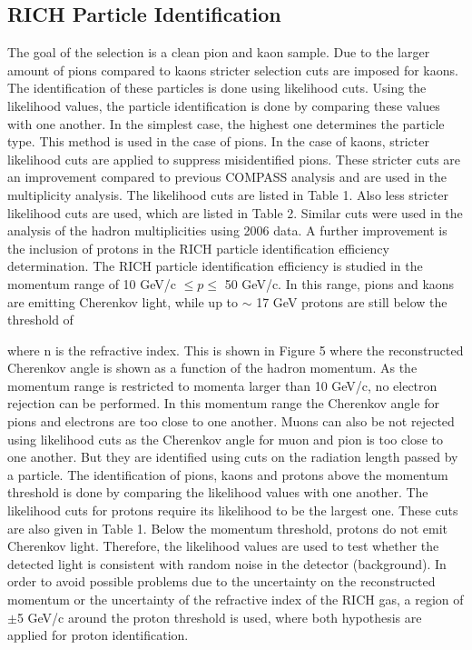 \subsection{RICH Particle Identification}

The goal of the selection is a clean pion and kaon sample. Due to the larger amount of pions compared to kaons stricter selection cuts are imposed for kaons. The
identification of these particles is done using likelihood cuts. Using the likelihood values, the particle identification is done by comparing these values with one
another. In the simplest case, the highest one determines the particle type. This method is used in the case of pions. In the case of kaons, stricter likelihood cuts
are applied to suppress misidentified pions. These stricter cuts are an improvement compared to previous COMPASS analysis and are used in the multiplicity analysis.
The likelihood cuts are listed in Table 1. Also less stricter likelihood cuts are used, which are listed in Table 2. Similar cuts were used in the analysis of the hadron
multiplicities using 2006 data. A further improvement is the inclusion of protons in the RICH particle identification efficiency determination.
The RICH particle identification efficiency is studied in the momentum range of 10 GeV/c $ \leq p \leq $ 50 GeV/c. In this range, pions and kaons are emitting Cherenkov
light, while up to $\sim$ 17 GeV protons are still below the threshold of


where n is the refractive index. This is shown in Figure 5 where the reconstructed Cherenkov angle is shown as a function of the hadron momentum. As the momentum range
is restricted to momenta larger than 10 GeV/c, no electron rejection can be performed. In this momentum range the Cherenkov angle for pions and electrons are too close
to one another. Muons can also be not rejected using likelihood cuts as the Cherenkov angle for muon and pion is too close to one another. But they are identified using
cuts on the radiation length passed by a particle. The identification of pions, kaons and protons above the momentum threshold is done by comparing the likelihood values
with one another. The likelihood cuts for protons require its likelihood to be the largest one. These cuts are also given in Table 1. Below the momentum threshold, protons
do not emit Cherenkov light. Therefore, the likelihood values are used to test whether the detected light is consistent with random noise in the detector (background).
In order to avoid possible problems due to the uncertainty on the reconstructed momentum or the uncertainty of the refractive index of the RICH gas, a region of $\pm$5 GeV/c
around the proton threshold is used, where both hypothesis are applied for proton identification.

